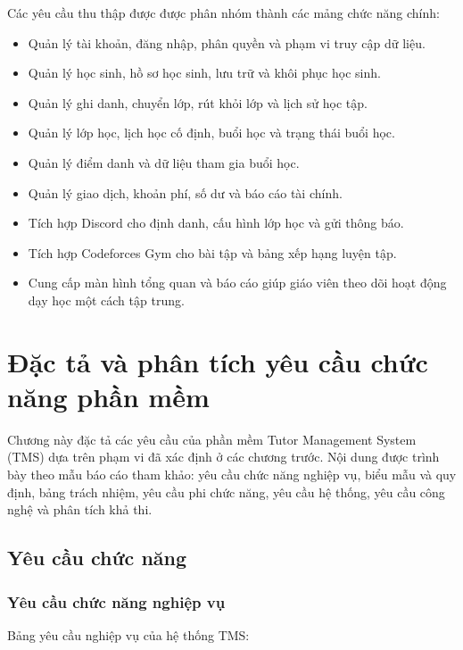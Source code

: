 \documentclass[12pt,a4paper]{article}
\begin{document}
Các yêu cầu thu thập được được phân nhóm thành các mảng chức năng chính:

\begin{itemize}[leftmargin=*]
    \item Quản lý tài khoản, đăng nhập, phân quyền và phạm vi truy cập dữ liệu.
    \item Quản lý học sinh, hồ sơ học sinh, lưu trữ và khôi phục học sinh.
    \item Quản lý ghi danh, chuyển lớp, rút khỏi lớp và lịch sử học tập.
    \item Quản lý lớp học, lịch học cố định, buổi học và trạng thái buổi học.
    \item Quản lý điểm danh và dữ liệu tham gia buổi học.
    \item Quản lý giao dịch, khoản phí, số dư và báo cáo tài chính.
    \item Tích hợp Discord cho định danh, cấu hình lớp học và gửi thông báo.
    \item Tích hợp Codeforces Gym cho bài tập và bảng xếp hạng luyện tập.
    \item Cung cấp màn hình tổng quan và báo cáo giúp giáo viên theo dõi hoạt động dạy
    học một cách tập trung.
\end{itemize}

\clearpage

\setcounter{section}{2}
\section{Đặc tả và phân tích yêu cầu chức năng phần mềm}

Chương này đặc tả các yêu cầu của phần mềm Tutor Management System (TMS) dựa
trên phạm vi đã xác định ở các chương trước. Nội dung được trình bày theo mẫu
báo cáo tham khảo: yêu cầu chức năng nghiệp vụ, biểu mẫu và quy định, bảng
trách nhiệm, yêu cầu phi chức năng, yêu cầu hệ thống, yêu cầu công nghệ và phân
tích khả thi.

\subsection{Yêu cầu chức năng}

\subsubsection{Yêu cầu chức năng nghiệp vụ}

Bảng yêu cầu nghiệp vụ của hệ thống TMS:
\end{document}

